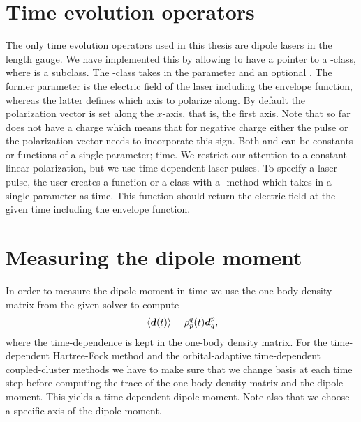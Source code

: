     \section{Time evolution operators}
        The only time evolution operators used in this thesis are dipole lasers
        in the length gauge.
        We have implemented this by allowing  to have a
        pointer to a -class, where 
        is a subclass.
        The -class takes in the parameter 
        and an optional .
        The former parameter is the electric field of the laser including the
        envelope function, whereas the latter defines which axis to polarize
        along.
        By default the polarization vector is set along the $x$-axis, that is,
        the first axis.
        Note that  so far does not have a charge which means
        that for negative charge either the pulse or the polarization vector
        needs to incorporate this sign.
        Both  and  can be constants
        or functions of a single parameter; time.
        We restrict our attention to a constant linear polarization, but we use
        time-dependent laser pulses.
        To specify a laser pulse, the user creates a function or a class with a
        -method which takes in a single parameter as time.
        This function should return the electric field at the given time
        including the envelope function.

    \section{Measuring the dipole moment}
        In order to measure the dipole moment in time we use the one-body
        density matrix from the given solver to compute
        \begin{align}
            \expval*{\boldsymbol{d}(t)}
            = \rho^{q}_{p}(t)\boldsymbol{d}^{p}_{q},
        \end{align}
        where the time-dependence is kept in the one-body density matrix.
        For the time-dependent Hartree-Fock method and the orbital-adaptive
        time-dependent coupled-cluster methods we have to make sure that we
        change basis at each time step before computing the trace of the
        one-body density matrix and the dipole moment.
        This yields a time-dependent dipole moment.
        Note also that we choose a specific axis of the dipole moment.

\clearemptydoublepage
